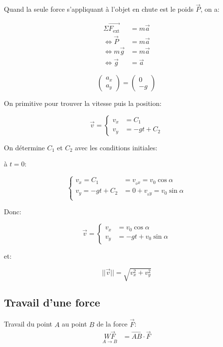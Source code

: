 \documentclass{article}
\newcommand{\vect}{\overrightarrow}
\begin{document}
Quand la seule force s'appliquant à l'objet en chute est le poids $\vec{P}$, on a:

\begin{equation*}
    \begin{split}
        \Sigma \vect{F_\text{ext}} &= m \vec a \\
        \iff \vec P &= m \vec a\\
        \iff m \vec g &= m \vec a \\
        \iff \vec g &= \vec a
    \end{split}
\end{equation*}

$$
\begin{pmatrix}
a_x \\ a_y
\end{pmatrix} = \begin{pmatrix}
0 \\ -g
\end{pmatrix}
$$

On primitive pour trouver la vitesse puis la position:

$$
\vec v = \begin{cases}
v_x &= C_1 \\
v_y &= -gt + C_2
\end{cases}
$$

On détermine $C_1$ et $C_2$ avec les conditions initiales:

à $t=0$:

$$
\begin{cases}
v_x = C_1 &= v_{_0x} = v_0 \cos \alpha \\
v_y = -gt + C_2 &= 0 + v_{_0y} = v_0 \sin \alpha \\
\end{cases}
$$

Donc: 

$$
\vec v = \begin{cases}
v_x &= v_0 \cos \alpha \\
v_y &= -gt + v_0\sin\alpha
\end{cases}
$$

et:

$$||\vec v|| = \sqrt{v_x^2 + v_y^2}$$

\subsection{Travail d'une force}

Travail du point $A$ au point $B$ de la force $\vec F$:
\begin{equation*}
    \begin{split}
        \underset{A\to B}{W\vec F} &= \vect{AB} \cdot \vec F
    \end{split}
\end{equation*}
\end{document}
